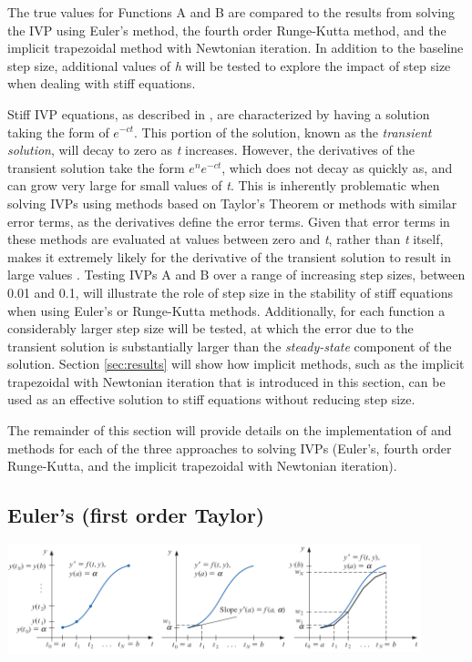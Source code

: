 \documentclass{article}
\begin{document}
The true values for Functions A and B are compared to the results from solving the IVP using Euler's method, the fourth order Runge-Kutta method, and the implicit trapezoidal method with Newtonian iteration. In addition to the baseline step size, additional values of \textit{h} will be tested to explore the impact of step size when dealing with stiff equations. 

Stiff IVP equations, as described in \cite{burden2010}, are characterized by having a solution taking the form of $e^{-ct}$. This portion of the solution, known as the \textit{transient solution}, will decay to zero as \textit{t} increases. However, the derivatives of the transient solution take the form $e^{n}e^{-ct}$, which does not decay as quickly as, and can grow very large for small values of \textit{t}. This is inherently problematic when solving IVPs using methods based on Taylor's Theorem or methods with similar error terms, as the derivatives define the error terms. Given that error terms in these methods are evaluated at values between zero and \textit{t}, rather than \textit{t} itself, makes it extremely likely for the derivative of the transient solution to result in large values \citep{burden2010}. Testing IVPs A and B over a range of increasing step sizes, between 0.01 and 0.1, will illustrate the role of step size in the stability of stiff equations when using Euler's or Runge-Kutta methods. Additionally, for each function a considerably larger step size will be tested, at which the error due to the transient solution is substantially larger than the \textit{steady-state} component of the solution. Section \ref{sec:results} will show how implicit methods, such as the implicit trapezoidal with Newtonian iteration that is introduced in this section, can be used as an effective solution to stiff equations without reducing step size.

The remainder of this section will provide details on the implementation of and methods for each of the three approaches to solving IVPs (Euler's, fourth order Runge-Kutta, and the implicit trapezoidal with Newtonian iteration).


\subsection{Euler's (first order Taylor)}
\label{method:euler}

\begin{center}
  \includegraphics[width=0.9\textwidth]{../additional/euler_method.png}
  \label{fig:euler_method}
\end{center}
\end{document}
